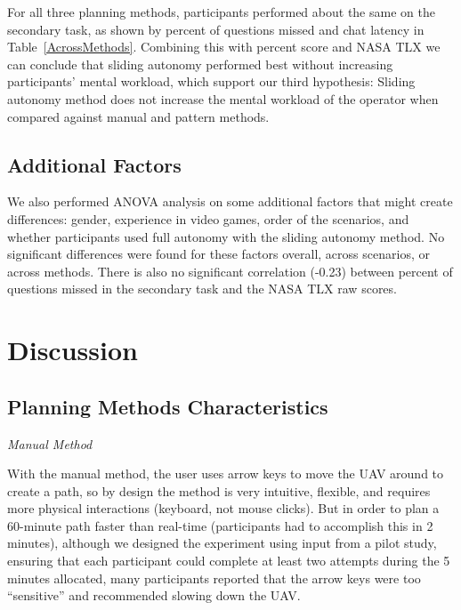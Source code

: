 \documentclass[lettersize, apacite, twoside, HRI]{apa_HRI}
\begin{document}
For all three planning methods, participants performed about the same on the secondary task, as shown by percent of questions missed and chat latency in Table~\ref{AcrossMethods}. Combining this with percent score and NASA TLX we can conclude that sliding autonomy performed best without increasing participants' mental workload, which support our third hypothesis: Sliding autonomy method does not increase the mental workload of the operator when compared against manual and pattern methods.

\subsection{Additional Factors}

We also performed ANOVA analysis on some additional factors that might create differences: gender, experience in video games, order of the scenarios, and whether participants used full autonomy with the sliding autonomy method. No significant differences were found for these factors overall, across scenarios, or across methods. There is also no significant correlation (-0.23) between percent of questions missed in the secondary task and the NASA TLX raw scores.

\section{Discussion} 
\label{sec:Discussion}

\subsection{Planning Methods Characteristics}

\noindent \textit{Manual Method}

With the manual method, the user uses arrow keys to move the UAV around to create a path, so by design the method is very intuitive, flexible, and requires more physical interactions (keyboard, not mouse clicks). But in order to plan a 60-minute path faster than real-time (participants had to accomplish this in 2 minutes), although we designed the experiment using input from a pilot study, ensuring that each participant could complete at least two attempts during the 5 minutes allocated, many participants reported that the arrow keys were too ``sensitive'' and recommended slowing down the UAV.
\end{document}

